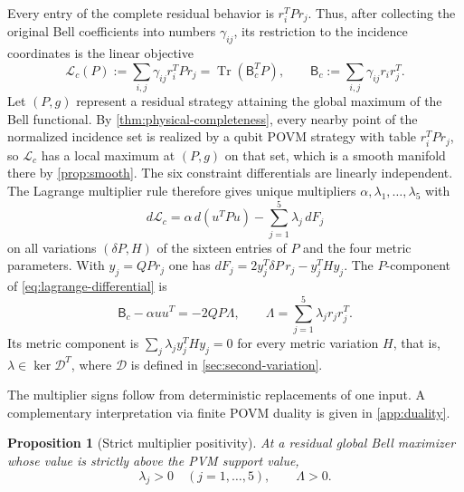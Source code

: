 \documentclass[11pt]{article}
\newtheorem{proposition}[theorem]{Proposition}
\theoremstyle{definition}
\newcommand{\Tr}{\operatorname{Tr}}
\newcommand{\cD}{\mathcal D}
\begin{document}
Every entry of the complete residual behavior is \(r_i^TPr_j\). Thus, after
collecting the original Bell coefficients into numbers
\(\gamma_{ij}\), its restriction to the incidence coordinates is the linear
objective
\[
\mathcal L_c(P):=\sum_{i,j}\gamma_{ij}r_i^TPr_j
=\Tr(\mathsf B_c^TP),\qquad
\mathsf B_c:=\sum_{i,j}\gamma_{ij}r_ir_j^T.
\]
Let \((P,g)\) represent a residual strategy attaining the global maximum of
the Bell functional. By \cref{thm:physical-completeness}, every nearby point
of the normalized incidence set is realized by a qubit POVM strategy with
table \(r_i^TPr_j\), so \(\mathcal L_c\) has a local maximum at \((P,g)\) on
that set, which is a smooth manifold there by \cref{prop:smooth}. The six
constraint differentials are linearly independent. The Lagrange multiplier
rule therefore gives unique multipliers
\(\alpha,\lambda_1,\ldots,\lambda_5\) with
\begin{equation}
\label{eq:lagrange-differential}
d\mathcal L_c=\alpha\,d(u^TPu)-\sum_{j=1}^5\lambda_j\,dF_j
\end{equation}
on all variations \((\delta P,H)\) of the sixteen entries of \(P\) and the
four metric parameters. With \(y_j=QPr_j\) one has
\(dF_j=2y_j^T\delta P\,r_j-y_j^THy_j\). The \(P\)-component of
\eqref{eq:lagrange-differential} is
\begin{equation}
\label{eq:lagrange}
\mathsf B_c-\alpha uu^T=-2QP\Lambda,\qquad
\Lambda=\sum_{j=1}^5\lambda_jr_jr_j^T.
\end{equation}
Its metric component is \(\sum_j\lambda_jy_j^THy_j=0\) for every metric
variation \(H\), that is,
\(\lambda\in\ker\cD^T\), where \(\cD\) is defined in
\cref{sec:second-variation}.

The multiplier signs follow from deterministic replacements of one input.
A complementary interpretation via finite POVM duality is given in
\cref{app:duality}.

\begin{proposition}[Strict multiplier positivity]
\label{prop:positive-multipliers}
At a residual global Bell maximizer whose value is strictly above the PVM
support value,
\[
\lambda_j>0\quad(j=1,\ldots,5),\qquad\Lambda>0.
\]
\end{proposition}
\end{document}
